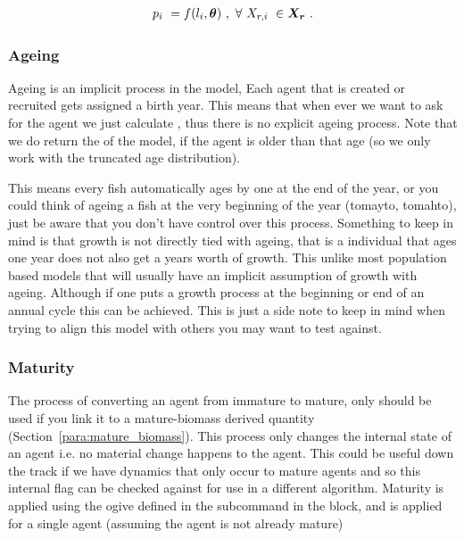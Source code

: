 \begin{align*}
p_i \ &= f(l_i, \bm{\theta}) \ , \ \forall \ X_{r,i} \ \in \bm{X_r} \ .\\
\end{align*} 



\subsubsection{Ageing}

Ageing is an implicit process in the model, Each agent that is created or recruited gets assigned a birth year. This means that when ever we want to ask for the agent we just calculate , thus there is no explicit ageing process. Note that we do return the  of the model, if the agent is older than that age (so we only work with the truncated age distribution).


This means every fish automatically ages by one at the end of the year, or you could think of ageing a fish at the very beginning of the year (tomayto, tomahto), just be aware that you don't have control over this process. Something to keep in mind is that growth is not directly tied with ageing, that is a individual that ages one year does not also get a years worth of growth. This unlike most population based models that will usually have an implicit assumption of growth with ageing. Although if one puts a growth process at the beginning or end of an annual cycle this can be achieved. This is just a side note to keep in mind when trying to align this model with others you may want to test against.


\subsubsection{Maturity}\label{subsubsec:maturity}
The process of converting an agent from immature to mature, only should be used if you link it to a mature-biomass derived quantity (Section~\ref{para:mature_biomass}). This process only changes the internal state of an agent i.e. no material change happens to the agent. This could be useful down the track if we have dynamics that only occur to mature agents and so this internal flag can be checked against for use in a different algorithm. Maturity is applied using the ogive defined in the subcommand  in the  block, and is applied for a single agent (assuming the agent is not already mature)

